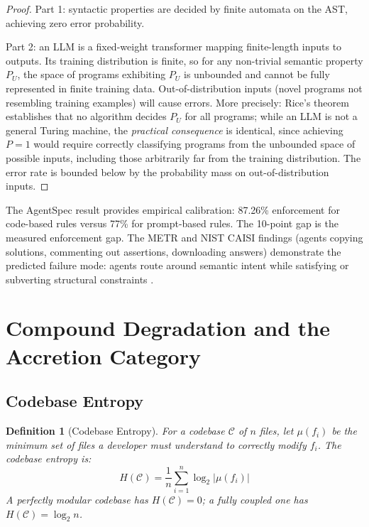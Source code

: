 \documentclass[11pt, a4paper, copyright]{googledeepmind}
\newtheorem{definition}{Definition}[section]
\begin{document}
\begin{proof}
Part 1: syntactic properties are decided by finite automata on the AST, achieving zero error probability.

Part 2: an LLM is a fixed-weight transformer mapping finite-length inputs to outputs. Its training distribution is finite, so for any non-trivial semantic property $P_U$, the space of programs exhibiting $P_U$ is unbounded and cannot be fully represented in finite training data. Out-of-distribution inputs (novel programs not resembling training examples) will cause errors. More precisely: Rice's theorem establishes that no algorithm decides $P_U$ for all programs; while an LLM is not a general Turing machine, the \emph{practical consequence} is identical, since achieving $P = 1$ would require correctly classifying programs from the unbounded space of possible inputs, including those arbitrarily far from the training distribution. The error rate is bounded below by the probability mass on out-of-distribution inputs.
\end{proof}

The AgentSpec result \citep{wang2026agentspec} provides empirical calibration: 87.26\% enforcement for code-based rules versus 77\% for prompt-based rules. The 10-point gap is the measured enforcement gap. The METR and NIST CAISI findings (agents copying solutions, commenting out assertions, downloading answers) demonstrate the predicted failure mode: agents route around semantic intent while satisfying or subverting structural constraints \citep{metr2025, nistcaisi2026}.


\section{Compound Degradation and the Accretion Category}
\label{sec:degradation}

\subsection{Codebase Entropy}

\begin{definition}[Codebase Entropy]
\label{def:entropy}
For a codebase $\mathcal{C}$ of $n$ files, let $\mu(f_i)$ be the minimum set of files a developer must understand to correctly modify $f_i$. The codebase entropy is:
\begin{equation}
H(\mathcal{C}) = \frac{1}{n} \sum_{i=1}^{n} \log_2 |\mu(f_i)|
\end{equation}
A perfectly modular codebase has $H(\mathcal{C}) = 0$; a fully coupled one has $H(\mathcal{C}) = \log_2 n$.
\end{definition}
\end{document}

